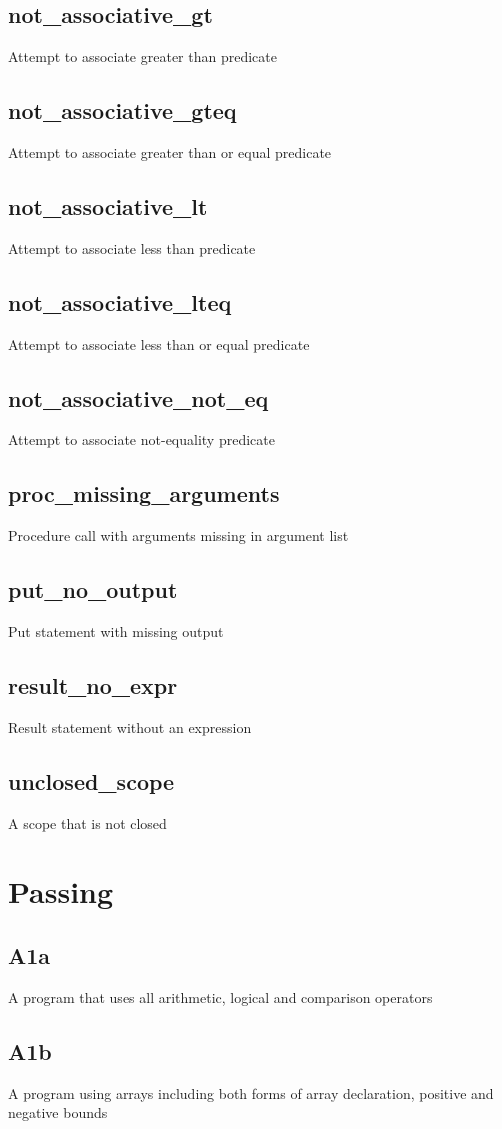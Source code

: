 \documentclass[oneside]{amsart}
\theoremstyle{definition}
\theoremstyle{remark}
\numberwithin{equation}{section}
\begin{document}
\subsection{not\_associative\_gt} Attempt to associate greater than predicate
\subsection{not\_associative\_gteq} Attempt to associate greater than or equal predicate
\subsection{not\_associative\_lt} Attempt to associate less than predicate
\subsection{not\_associative\_lteq} Attempt to associate less than or equal predicate
\subsection{not\_associative\_not\_eq} Attempt to associate not-equality predicate
\subsection{proc\_missing\_arguments} Procedure call with arguments missing in argument list
\subsection{put\_no\_output} Put statement with missing output
\subsection{result\_no\_expr} Result statement without an expression
\subsection{unclosed\_scope} A scope that is not closed

\section{Passing}
\subsection{A1a} A program that uses all arithmetic, logical and comparison operators
\subsection{A1b} A program using arrays including both forms of array declaration, positive and negative bounds
\end{document}
